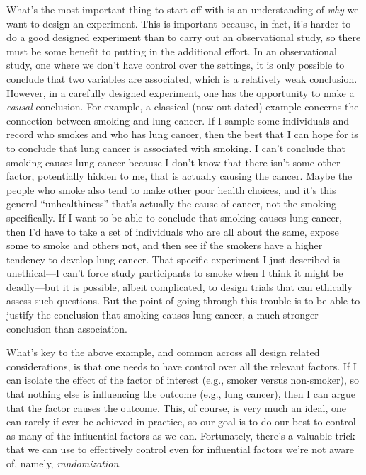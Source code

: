 \documentclass[a4paper, 12pt]{article}
\theoremstyle{plain}
\theoremstyle{definition}
\theoremstyle{remark}
\begin{document}
What's the most important thing to start off with is an understanding of {\em why} we want to design an experiment.  This is important because, in fact, it's harder to do a good designed experiment than to carry out an observational study, so there must be some benefit to putting in the additional effort.  In an observational study, one where we don't have control over the settings, it is only possible to conclude that two variables are associated, which is a relatively weak conclusion.  However, in a carefully designed experiment, one has the opportunity to make a {\em causal} conclusion.  For example, a classical (now out-dated) example concerns the connection between smoking and lung cancer.  If I sample some individuals and record who smokes and who has lung cancer, then the best that I can hope for is to conclude that lung cancer is associated with smoking.  I can't conclude that smoking causes lung cancer because I don't know that there isn't some other factor, potentially hidden to me, that is actually causing the cancer.  Maybe the people who smoke also tend to make other poor health choices, and it's this general ``unhealthiness'' that's actually the cause of cancer, not the smoking specifically.  If I want to be able to conclude that smoking causes lung cancer, then I'd have to take a set of individuals who are all about the same, expose some to smoke and others not, and then see if the smokers have a higher tendency to develop lung cancer.  That specific experiment I just described is unethical---I can't force study participants to smoke when I think it might be deadly---but it is possible, albeit complicated, to design trials that can ethically assess such questions.  But the point of going through this trouble is to be able to justify the conclusion that smoking causes lung cancer, a much stronger conclusion than association.  

What's key to the above example, and common across all design related considerations, is that one needs to have control over all the relevant factors.  If I can isolate the effect of the factor of interest (e.g., smoker versus non-smoker), so that nothing else is influencing the outcome (e.g., lung cancer), then I can argue that the factor causes the outcome.  This, of course, is very much an ideal, one can rarely if ever be achieved in practice, so our goal is to do our best to control as many of the influential factors as we can.  Fortunately, there's a valuable trick that we can use to effectively control even for influential factors we're not aware of, namely, {\em randomization}. 
\end{document}
